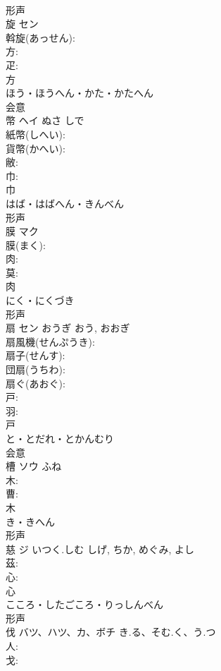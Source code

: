 \documentclass[8pt]{extreport}
\begin{document}
\begin{CJK}{UTF8}{min}
\\	形声 
\\	旋	セン			
\\	斡旋(あっせん): 
\\	方: 
\\	疋: 
\\	方	
\\	ほう・ほうへん・かた・かたへん	
\\	会意 
\\	幣	ヘイ	ぬさ	しで	
\\	紙幣(しへい): 
\\	貨幣(かへい): 
\\	敝: 
\\	巾: 
\\	巾	
\\	はば・はばへん・きんべん	
\\	形声 
\\	膜	マク			
\\	膜(まく): 
\\	肉: 
\\	莫: 
\\	肉	
\\	にく・にくづき	
\\	形声 
\\	扇	セン	おうぎ	おう, おおぎ	
\\	扇風機(せんぷうき): 
\\	扇子(せんす): 
\\	団扇(うちわ): 
\\	扇ぐ(あおぐ): 
\\	戸: 
\\	羽: 
\\	戸	
\\	と・とだれ・とかんむり	
\\	会意 
\\	槽	ソウ	ふね		
\\	木: 
\\	曹: 
\\	木	
\\	き・きへん	
\\	形声 
\\	慈	ジ	いつく.しむ	しげ, ちか, めぐみ, よし	
\\	茲: 
\\	心: 
\\	心	
\\	こころ・したごころ・りっしんべん	
\\	形声 
\\	伐	バツ、ハツ、カ、ボチ	き.る、そむ.く、う.つ		
\\	人: 
\\	戈: 

\end{CJK}
\end{document}

